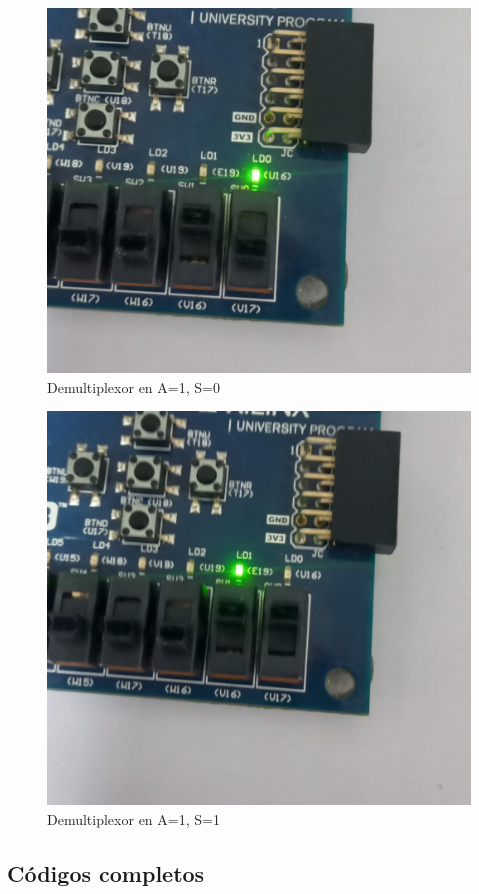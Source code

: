 \documentclass[12pt]{article}  %
\begin{document}
\begin{figure}[!ht]
    \centering
    \caption{Demultiplexor en A=1, S=0}
    \includegraphics[width=0.5\linewidth]{simulations/demux/demux-10.jpg}
\end{figure}
\begin{figure}[!ht]
    \centering
    \caption{Demultiplexor en A=1, S=1}
    \includegraphics[width=0.5\linewidth]{simulations/demux/demux-11.jpg}
\end{figure}
\newpage

\subsection*{Códigos completos}










\end{document}
